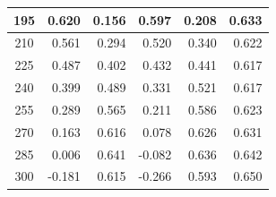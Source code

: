\begin{table}[htbp]
\begin{center}
\begin{tabular}{|p{20mm}|p{20mm}|p{20mm}|p{20mm}|p{20mm}|p{20mm}|}
      \multicolumn{1}{|c|}{195}                     & \multicolumn{1}{|r|}{0.620}                & \multicolumn{1}{|r|}{0.156}                & \multicolumn{1}{|r|}{0.597}                & \multicolumn{1}{|r|}{0.208}                & \multicolumn{1}{|r|}{0.633}                    \\ \hline
      \multicolumn{1}{|c|}{210}                     & \multicolumn{1}{|r|}{0.561}                & \multicolumn{1}{|r|}{0.294}                & \multicolumn{1}{|r|}{0.520}                & \multicolumn{1}{|r|}{0.340}                & \multicolumn{1}{|r|}{0.622}                    \\ \hline
      \multicolumn{1}{|c|}{225}                     & \multicolumn{1}{|r|}{0.487}                & \multicolumn{1}{|r|}{0.402}                & \multicolumn{1}{|r|}{0.432}                & \multicolumn{1}{|r|}{0.441}                & \multicolumn{1}{|r|}{0.617}                    \\ \hline
      \multicolumn{1}{|c|}{240}                     & \multicolumn{1}{|r|}{0.399}                & \multicolumn{1}{|r|}{0.489}                & \multicolumn{1}{|r|}{0.331}                & \multicolumn{1}{|r|}{0.521}                & \multicolumn{1}{|r|}{0.617}                    \\ \hline
      \multicolumn{1}{|c|}{255}                     & \multicolumn{1}{|r|}{0.289}                & \multicolumn{1}{|r|}{0.565}                & \multicolumn{1}{|r|}{0.211}                & \multicolumn{1}{|r|}{0.586}                & \multicolumn{1}{|r|}{0.623}                    \\ \hline
      \multicolumn{1}{|c|}{270}                     & \multicolumn{1}{|r|}{0.163}                & \multicolumn{1}{|r|}{0.616}                & \multicolumn{1}{|r|}{0.078}                & \multicolumn{1}{|r|}{0.626}                & \multicolumn{1}{|r|}{0.631}                    \\ \hline
      \multicolumn{1}{|c|}{285}                     & \multicolumn{1}{|r|}{0.006}                & \multicolumn{1}{|r|}{0.641}                & \multicolumn{1}{|r|}{-0.082}               & \multicolumn{1}{|r|}{0.636}                & \multicolumn{1}{|r|}{0.642}                    \\ \hline
      \multicolumn{1}{|c|}{300}                     & \multicolumn{1}{|r|}{-0.181}               & \multicolumn{1}{|r|}{0.615}                & \multicolumn{1}{|r|}{-0.266}               & \multicolumn{1}{|r|}{0.593}                & \multicolumn{1}{|r|}{0.650}                    \\ \hline

\end{tabular}
\end{center}
\end{table}
